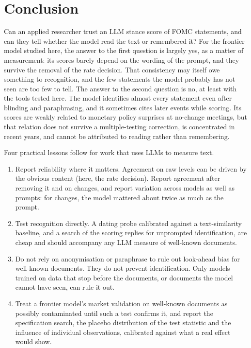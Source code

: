 \section{Conclusion}\label{sec:conclusion}

Can an applied researcher trust an LLM stance score of FOMC statements, and can they tell whether the
model read the text or remembered it? For the frontier model studied here, the answer to the first
question is largely yes, as a matter of measurement: its scores barely depend on the wording of the
prompt, and they survive the removal of the rate decision. That consistency may itself owe something to
recognition, and the few statements the model probably has not seen are too few to tell. The answer to
the second question is no, at least with the tools tested here. The model identifies almost every
statement even after blinding and paraphrasing, and it sometimes cites later events while scoring. Its
scores are weakly related to monetary policy surprises at no-change meetings, but that relation does not
survive a multiple-testing correction, is concentrated in recent years, and cannot be attributed to
reading rather than remembering.

Four practical lessons follow for work that uses LLMs to measure text.
\begin{enumerate}
\item Report reliability where it matters. Agreement on raw levels can be driven by the obvious content
(here, the rate decision). Report agreement after removing it and on changes, and report variation across
models as well as prompts: for changes, the model mattered about twice as much as the prompt.
\item Test recognition directly. A dating probe calibrated against a text-similarity baseline, and a
search of the scoring replies for unprompted identification, are cheap and should accompany any LLM
measure of well-known documents.
\item Do not rely on anonymisation or paraphrase to rule out look-ahead bias for well-known documents.
They do not prevent identification. Only models trained on data that stop before the documents, or
documents the model cannot have seen, can rule it out.
\item Treat a frontier model's market validation on well-known documents as possibly contaminated until such
a test confirms it, and report the specification search, the placebo distribution of the test statistic
and the influence of individual observations, calibrated against what a real effect would show.
\end{enumerate}

